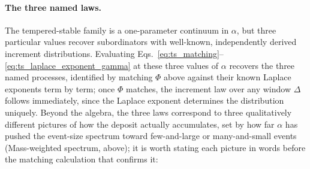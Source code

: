 \documentclass[preprint,12pt]{elsarticle}
\begin{document}
\paragraph*{The three named laws.}
The tempered-stable family is a one-parameter continuum in $\alpha$, but
three particular values recover subordinators with well-known, independently
derived increment distributions. Evaluating
Eqs.~\eqref{eq:ts_matching}--\eqref{eq:ts_laplace_exponent_gamma}
at these three values of $\alpha$ recovers the three named processes,
identified by matching $\Phi$ above against their known Laplace exponents
term by term; once $\Phi$ matches, the increment law over any window
$\Delta$ follows immediately, since the Laplace exponent determines the
distribution uniquely. Beyond the algebra, the three laws correspond to
three qualitatively different pictures of how the deposit actually
accumulates, set by how far $\alpha$ has pushed the event-size spectrum
toward few-and-large or many-and-small events (Mass-weighted spectrum,
above); it is worth stating each picture in words before the matching
calculation that confirms it:
\end{document}
